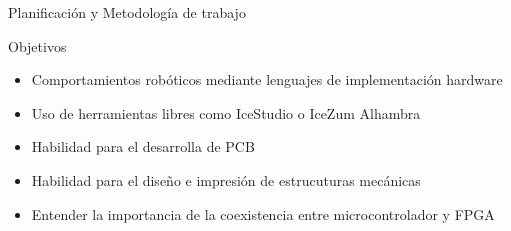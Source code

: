 \documentclass{beamer}
\begin{document}
\begin{frame}{Planificación y Metodología de trabajo}
\begin{figure}[H]
	\center	
\end{figure}
\end{frame}


\begin{frame}{Objetivos}
\begin{block}{}
	\begin{itemize}
		\item Comportamientos robóticos mediante lenguajes de implementación hardware \pause
		\item Uso de herramientas libres como IceStudio o IceZum Alhambra \pause
		\item Habilidad para el desarrolla de PCB \pause
		\item Habilidad para el diseño e impresión de estrucuturas mecánicas \pause
		\item Entender la importancia de la coexistencia entre microcontrolador y FPGA 
	\end{itemize}
\end{block}
\end{frame}
\end{document}
